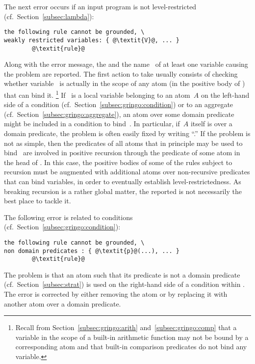 The next error occurs if an input program is not level-restricted
(cf.\ Section~\ref{subsec:lambda}):
%
\begin{lstlisting}[numbers=none,escapechar=@]
the following rule cannot be grounded, \
weakly restricted variables: { @\textit{V}@, ... }
        @\textit{rule}@
\end{lstlisting}
%
Along with the error message, the  and the
name~ of at least one variable causing the problem
are reported.
The first action to take usually consists of checking whether
variable~ is actually in the scope of any atom
(in the positive body of ) that can bind it.%
\footnote{%
  Recall from Section~\ref{subsec:gringo:arith} and~\ref{subsec:gringo:comp}
  that a variable in the scope of a built-in arithmetic function may not be bound
  by a corresponding atom and that built-in comparison predicates do not bind
  any variable.}
If~ is a local variable belonging to an atom~$A$ 
on the left-hand side of a condition (cf.\ Section~\ref{subsec:gringo:condition})
or to an aggregate (cf.\ Section~\ref{subsec:gringo:aggregate}),
an atom over some domain predicate might be included in a condition
to bind~\code{\textit{V}}.
In particular, if~$A$ itself is over a domain predicate,
the problem is often easily fixed by writing ``.''
If the problem is not as simple,
then the predicates of all atoms that in principle may be used
to bind~ are involved in positive recursion
through the predicate of some atom in the head of .
In this case, the positive bodies of some of the rules subject to recursion
must be augmented with additional atoms over non-recursive predicates that
can bind variables, in order to eventually establish level-restrictedness.
As breaking recursion is a rather global matter, the reported
 is not necessarily the best place to tackle it.

The following error is related to conditions
(cf.\ Section~\ref{subsec:gringo:condition}):
%
\begin{lstlisting}[numbers=none,escapechar=@]
the following rule cannot be grounded, \
non domain predicates : { @\textit{p}@(...), ... }
        @\textit{rule}@
\end{lstlisting}
%
The problem is that an atom  such
that its predicate  is not a domain predicate
(cf.\ Section~\ref{subsec:strat}) is used on the right-hand side of a condition
within \code{\textit{rule}}.
The error is corrected by either removing the atom or
by replacing it with another atom over a domain predicate.

